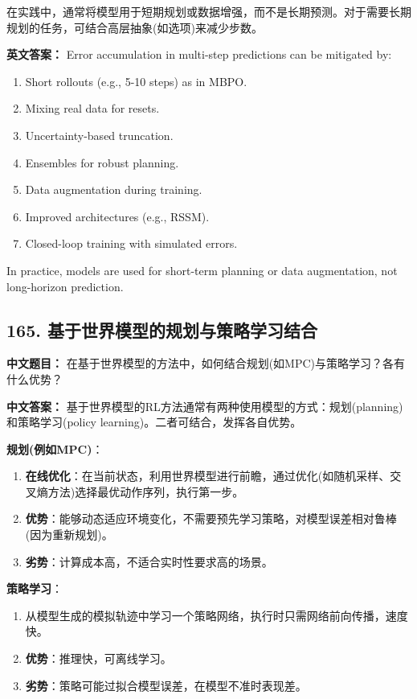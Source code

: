 \documentclass[10pt,a4paper]{ctexart}
\begin{document}
在实践中，通常将模型用于短期规划或数据增强，而不是长期预测。对于需要长期规划的任务，可结合高层抽象(如选项)来减少步数。

\textbf{英文答案：}  
Error accumulation in multi-step predictions can be mitigated by:
\begin{enumerate}
    \item Short rollouts (e.g., 5-10 steps) as in MBPO.
    \item Mixing real data for resets.
    \item Uncertainty-based truncation.
    \item Ensembles for robust planning.
    \item Data augmentation during training.
    \item Improved architectures (e.g., RSSM).
    \item Closed-loop training with simulated errors.
\end{enumerate}
In practice, models are used for short-term planning or data augmentation, not long-horizon prediction.

\subsection*{165. 基于世界模型的规划与策略学习结合}
\textbf{中文题目：} 在基于世界模型的方法中，如何结合规划(如MPC)与策略学习？各有什么优势？

\textbf{中文答案：}  
基于世界模型的RL方法通常有两种使用模型的方式：规划(planning)和策略学习(policy learning)。二者可结合，发挥各自优势。

\textbf{规划(例如MPC)}：
\begin{enumerate}
    \item \textbf{在线优化}：在当前状态，利用世界模型进行前瞻，通过优化(如随机采样、交叉熵方法)选择最优动作序列，执行第一步。
    \item \textbf{优势}：能够动态适应环境变化，不需要预先学习策略，对模型误差相对鲁棒(因为重新规划)。
    \item \textbf{劣势}：计算成本高，不适合实时性要求高的场景。
\end{enumerate}

\textbf{策略学习}：
\begin{enumerate}
    \item 从模型生成的模拟轨迹中学习一个策略网络，执行时只需网络前向传播，速度快。
    \item \textbf{优势}：推理快，可离线学习。
    \item \textbf{劣势}：策略可能过拟合模型误差，在模型不准时表现差。
\end{enumerate}
\end{document}
